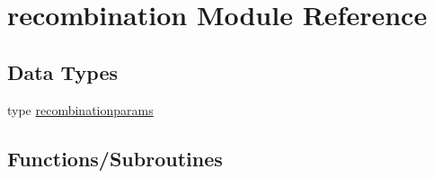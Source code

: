 \hypertarget{namespacerecombination}{}\section{recombination Module Reference}
\label{namespacerecombination}
\subsection*{Data Types}
\begin{DoxyCompactItemize}
\item 
type \mbox{\hyperlink{structrecombination_1_1recombinationparams}{recombinationparams}}
\end{DoxyCompactItemize}
\subsection*{Functions/\+Subroutines}
